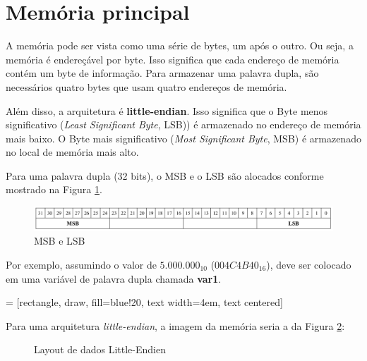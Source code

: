 \section{Memória principal}
A memória pode ser vista como uma série de bytes, um após o outro. Ou seja, a memória é endereçável por byte. Isso significa que cada endereço de memória contém um byte de informação. Para armazenar uma palavra dupla, são necessários quatro bytes que usam quatro endereços de memória.

Além disso, a arquitetura é \textbf{little-endian}. Isso significa que o Byte menos significativo (\textit{Least Significant Byte}, LSB)) é armazenado no endereço de memória mais baixo. O Byte mais significativo (\textit{Most Significant Byte}, MSB) é armazenado no local de memória mais alto.

Para uma palavra dupla (32 bits), o MSB e o LSB são alocados conforme mostrado na Figura \ref{fig:msb}.
\begin{figure}[ht]
	\begin{center}
		\includegraphics[width=\linewidth]{imagens/msb}
	\end{center}
	\caption{MSB e LSB}
	\label{fig:msb}
\end{figure}

Por exemplo, assumindo o valor de $ 5.000.000_{10} $ ($ 004C4B40_{16} $), deve ser colocado em uma variável de palavra dupla chamada \textbf{var1}.

 = [rectangle, draw, fill=blue!20, 
text width=4em, text centered]

Para uma arquitetura \textit{little-endian}, a imagem da memória seria a da Figura \ref{fig:littleendien}:
\begin{figure}[ht]
	\begin{center}
	\end{center}
	\caption{Layout de dados Little-Endien}
	\label{fig:littleendien}
\end{figure}

